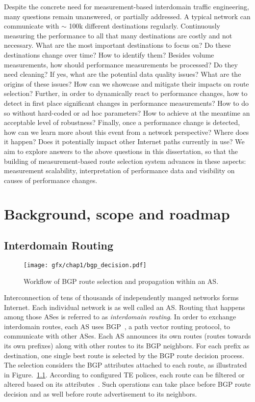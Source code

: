 Despite the concrete need for measurement-based interdomain traffic engineering, many questions remain unanswered, or partially addressed.
A typical network can communicate with $\sim$ 100k different destinations regularly. 
Continuously measuring the performance to all that many destinations are costly and not necessary. 
What are the most important destinations to focus on? Do these destinations change over time? How to identify them?
Besides volume measurements, how should performance measurements be processed? Do they need cleaning?
If yes, what are the potential data quality issues? What are the origins of these issues? How can we showcase and mitigate their impacts on route selection?
Further, in order to dynamically react to performance changes, how to detect in first place significant changes in performance measurements? How to do so without hard-coded or ad hoc parameters? How to achieve at the meantime an acceptable level of robustness?
Finally, once a performance change is detected, how can we learn more about this event from a network perspective? Where does it happen? Does it potentially impact other Internet paths currently in use? 
We aim to explore answers to the above questions in this dissertation, so that the building of measurement-based route selection system advances in these aspects: measurement scalability, interpretation of performance data and visibility on causes of performance changes. 

\chapter{Background, scope and roadmap}
\section{Interdomain Routing}
\begin{figure}[!htb]
\centering
\texttt{[image: gfx/chap1/bgp\_decision.pdf]}
\caption{Workflow of \acf{BGP} route selection and propagation within an \acf{AS}.}
\label{fig:bgp_decision}
\end{figure}

Interconnection of tens of thousands of independently manged networks forms Internet.
Each individual network is as well called an \acf{AS}.
Routing that happens among those ASes is referred to as 
\textit{interdomain routing}.
In order to exchange interdomain routes, each AS uses \acf{BGP}~\cite{bgp4}, a path vector routing protocol, to communicate with other ASes.
Each AS announces its own routes (routes towards its own prefixes) along with other routes to its BGP neighbors.
For each prefix as destination, one single best route is selected by the BGP route decision process.
The selection considers the BGP attributes attached to each route, as illustrated in Figure.~\ref{fig:bgp_decision}.
According to configured TE polices, each route can be filtered or altered based on its attributes~\cite{Quoitin2003, Gao2001a}.
Such operations can take place before BGP route decision and as well before route advertisement to its neighbors.

